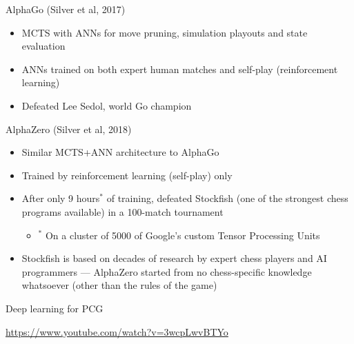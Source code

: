 \begin{frame}{AlphaGo (Silver et al, 2017)}
	\begin{itemize}
		\pause\item MCTS with ANNs for move pruning, simulation playouts and state evaluation
		\pause\item ANNs trained on both expert human matches and self-play (reinforcement learning)
		\pause\item Defeated Lee Sedol, world Go champion
	\end{itemize}
\end{frame}

\begin{frame}{AlphaZero (Silver et al, 2018)}
	\begin{itemize}
		\pause\item Similar MCTS+ANN architecture to AlphaGo
		\pause\item Trained by reinforcement learning (self-play) only
		\pause\item After only 9 hours$^*$ of training, defeated Stockfish
			(one of the strongest chess programs available) in a 100-match tournament
			\begin{itemize}
				\pause\item $^*$ On a cluster of 5000 of Google's custom Tensor Processing Units
			\end{itemize}
		\pause\item Stockfish is based on decades of research by expert chess players and AI programmers
			--- AlphaZero started from no chess-specific knowledge whatsoever (other than the rules of the game)
	\end{itemize}
\end{frame}

\begin{frame}{Deep learning for PCG}
	\begin{center}
		\url{https://www.youtube.com/watch?v=3wcpLwvBTYo}
	\end{center}
\end{frame}
